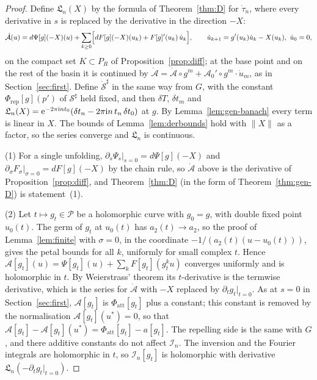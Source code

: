 \begin{proof}
Define $\mathfrak L_n(X)$ by the formula of Theorem~\ref{thm:D} for
$\dot\tau_n$, where every derivative in $s$ is replaced by the derivative in the
direction $-X$:
\[
 \dot{\mathcal A}(u)=d\Psi[g](-X)(u)
 +\sum_{k\ge0}\Bigl[dF[g](-X)(u_k)+F[g]'(u_k)\,\dot u_k\Bigr],\qquad
 \dot u_{k+1}=g'(u_k)\dot u_k-X(u_k),\ \dot u_0=0,
\]
on the compact set $K\subset P_R$ of Proposition~\ref{prop:diff}; at the base
point and on the rest of the basin it is continued by
$\dot{\mathcal A}=\dot{\mathcal A}\circ g^m+\mathcal A_0'\circ g^m\cdot\dot u_m$,
as in Section~\ref{sec:first}.  Define $\dot{\mathcal S}^\sharp$ in the same way from
$G$, with the constant $\Phi_{\mathrm{rep}}[g](p')$ of $\mathcal S^\sharp$ held
fixed, and then $\delta T$, $\delta t_m$ and
$\mathfrak L_n(X)=\mathrm{e}^{-2\pi\mathrm{i} nt_0}(\delta t_n-2\pi\mathrm{i} n\,t_n\,\delta t_0)$ at $g$.  By
Lemma~\ref{lem:gen-banach} every term is linear in $X$.  The bounds of
Lemma~\ref{lem:derbounds} hold with $\|X\|$ as a factor, so the series converge
and $\mathfrak L_n$ is continuous.

(1) For a single unfolding, $\partial_s\Psi_s|_{s=0}=d\Psi[g](-X)$ and
$\partial_\sigma F_\sigma|_{\sigma=0}=dF[g](-X)$ by the chain rule, so
$\dot{\mathcal A}$ above is the derivative of Proposition~\ref{prop:diff}, and
Theorem~\ref{thm:D} (in the form of Theorem~\ref{thm:gen-D}) is statement~(1).

(2) Let $t\mapsto g_t\in\mathcal P$ be a holomorphic curve with $g_0=g$, with
double fixed point $u_0(t)$.  The germ of $g_t$ at $u_0(t)$ has
$a_2(t)\to a_2$, so the proof of Lemma~\ref{lem:finite} with $\sigma=0$, in the
coordinate $-1/(a_2(t)(u-u_0(t)))$, gives the petal bounds for all $k$,
uniformly for small complex $t$.  Hence
$\mathcal A[g_t](u)=\Psi[g_t](u)+\sum_kF[g_t](g_t^ku)$ converges uniformly and
is holomorphic in $t$.  By Weierstrass' theorem its $t$-derivative is the
termwise derivative, which is the series for $\dot{\mathcal A}$ with $-X$
replaced by $\partial_tg_t|_{t=0}$.  As at $s=0$ in
Section~\ref{sec:first}, $\mathcal A[g_t]$ is $\Phi_{\mathrm{att}}[g_t]$ plus a
constant; this constant is removed by the normalisation
$\mathcal A[g_t](u^*)=0$, so that $\mathcal A[g_t]-\mathcal A[g_t](u^*)=\Phi_{\mathrm{att}}[g_t]-a[g_t]$.
The repelling side is the same with $G$, and there additive constants do not
affect $\mathcal I_n$.  The inversion and the Fourier integrals are holomorphic
in $t$, so $\mathcal I_n[g_t]$ is holomorphic with derivative
$\mathfrak L_n(-\partial_tg_t|_{t=0})$.
\end{proof}

